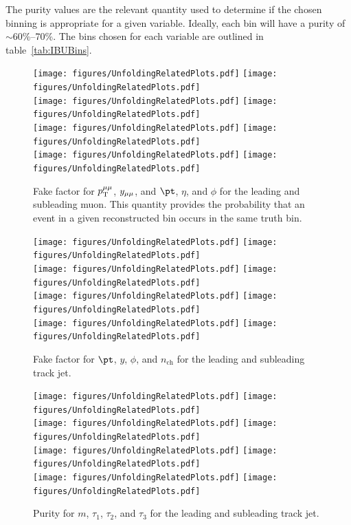 The purity values are the relevant quantity used to determine if the chosen binning is appropriate for a given variable. Ideally, each bin will have a purity of $\sim$60\%--70\%. The bins chosen for each variable are outlined in table~\ref{tab:IBUBins}.

\begin{figure}[h!]
  \centering
  \texttt{[image: figures/UnfoldingRelatedPlots.pdf]}
  \texttt{[image: figures/UnfoldingRelatedPlots.pdf]} \\
  \texttt{[image: figures/UnfoldingRelatedPlots.pdf]}
  \texttt{[image: figures/UnfoldingRelatedPlots.pdf]} \\
  \texttt{[image: figures/UnfoldingRelatedPlots.pdf]}
  \texttt{[image: figures/UnfoldingRelatedPlots.pdf]} \\
  \texttt{[image: figures/UnfoldingRelatedPlots.pdf]}
  \texttt{[image: figures/UnfoldingRelatedPlots.pdf]}
  \caption{Fake factor for $p_\mathrm{T}^{\mu\mu}$, $y_{\mu\mu}$, and $\pt$, $\eta$, and $\phi$ for the leading and subleading muon. This quantity provides the probability that an event in a given reconstructed bin occurs in the same truth bin.}
  \label{fig:ffDilep}
\end{figure}

\begin{figure}[h!]
  \centering
  \texttt{[image: figures/UnfoldingRelatedPlots.pdf]}
  \texttt{[image: figures/UnfoldingRelatedPlots.pdf]} \\
  \texttt{[image: figures/UnfoldingRelatedPlots.pdf]}
  \texttt{[image: figures/UnfoldingRelatedPlots.pdf]} \\
  \texttt{[image: figures/UnfoldingRelatedPlots.pdf]}
  \texttt{[image: figures/UnfoldingRelatedPlots.pdf]} \\
  \texttt{[image: figures/UnfoldingRelatedPlots.pdf]}
  \texttt{[image: figures/UnfoldingRelatedPlots.pdf]}
  \caption{Fake factor for $\pt$, $y$, $\phi$, and $n_{\text{ch}}$ for the leading and subleading track jet.}
  \label{fig:ffTJ1}
\end{figure}

\begin{figure}[h!]
  \centering
  \texttt{[image: figures/UnfoldingRelatedPlots.pdf]}
  \texttt{[image: figures/UnfoldingRelatedPlots.pdf]} \\
  \texttt{[image: figures/UnfoldingRelatedPlots.pdf]}
  \texttt{[image: figures/UnfoldingRelatedPlots.pdf]} \\
  \texttt{[image: figures/UnfoldingRelatedPlots.pdf]}
  \texttt{[image: figures/UnfoldingRelatedPlots.pdf]} \\
  \texttt{[image: figures/UnfoldingRelatedPlots.pdf]}
  \texttt{[image: figures/UnfoldingRelatedPlots.pdf]}
  \caption{Purity for $m$, $\tau_1$, $\tau_2$, and $\tau_3$ for the leading and subleading track jet.}
  \label{fig:ffTJ2}
\end{figure}

